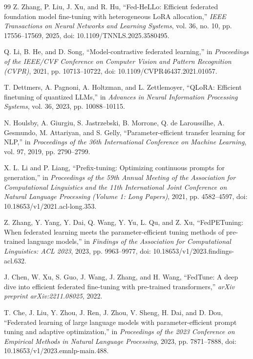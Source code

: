 \documentclass[10pt,conference,letterpaper]{IEEEtran}
\begin{document}
\begin{thebibliography}{99}
Z. Zhang, P. Liu, J. Xu, and R. Hu,
``Fed-HeLLo: Efficient federated foundation model fine-tuning with heterogeneous LoRA allocation,''
\emph{IEEE Transactions on Neural Networks and Learning Systems}, vol. 36, no. 10, pp. 17556--17569, 2025,
doi: 10.1109/TNNLS.2025.3580495.

Q. Li, B. He, and D. Song,
``Model-contrastive federated learning,''
in \emph{Proceedings of the IEEE/CVF Conference on Computer Vision and Pattern Recognition (CVPR)}, 2021, pp. 10713--10722,
doi: 10.1109/CVPR46437.2021.01057.

T. Dettmers, A. Pagnoni, A. Holtzman, and L. Zettlemoyer,
``QLoRA: Efficient finetuning of quantized LLMs,''
in \emph{Advances in Neural Information Processing Systems}, vol. 36, 2023, pp. 10088--10115.

N. Houlsby, A. Giurgiu, S. Jastrzebski, B. Morrone, Q. de Laroussilhe, A. Gesmundo, M. Attariyan, and S. Gelly,
``Parameter-efficient transfer learning for NLP,''
in \emph{Proceedings of the 36th International Conference on Machine Learning}, vol. 97, 2019, pp. 2790--2799.

X. L. Li and P. Liang,
``Prefix-tuning: Optimizing continuous prompts for generation,''
in \emph{Proceedings of the 59th Annual Meeting of the Association for Computational Linguistics and the 11th International Joint Conference on Natural Language Processing (Volume 1: Long Papers)}, 2021, pp. 4582--4597,
doi: 10.18653/v1/2021.acl-long.353.

Z. Zhang, Y. Yang, Y. Dai, Q. Wang, Y. Yu, L. Qu, and Z. Xu,
``FedPETuning: When federated learning meets the parameter-efficient tuning methods of pre-trained language models,''
in \emph{Findings of the Association for Computational Linguistics: ACL 2023}, 2023, pp. 9963--9977,
doi: 10.18653/v1/2023.findings-acl.632.

J. Chen, W. Xu, S. Guo, J. Wang, J. Zhang, and H. Wang,
``FedTune: A deep dive into efficient federated fine-tuning with pre-trained transformers,''
\emph{arXiv preprint arXiv:2211.08025}, 2022.

T. Che, J. Liu, Y. Zhou, J. Ren, J. Zhou, V. Sheng, H. Dai, and D. Dou,
``Federated learning of large language models with parameter-efficient prompt tuning and adaptive optimization,''
in \emph{Proceedings of the 2023 Conference on Empirical Methods in Natural Language Processing}, 2023, pp. 7871--7888,
doi: 10.18653/v1/2023.emnlp-main.488.


\end{thebibliography}
\end{document}
